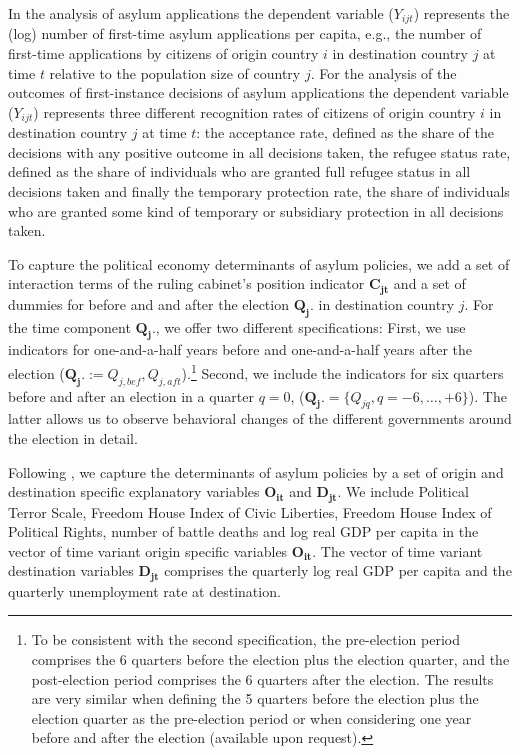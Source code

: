 \documentclass[a4paper,12pt]{article}
\begin{document}
In the analysis of asylum applications the dependent variable ($Y_{ijt}$) represents the (log) number of first-time asylum applications per capita, e.g., the number of first-time applications by citizens of origin country $i$ in destination country $j$ at time $t$ relative to the population size of country $j$. For the analysis of the outcomes of first-instance decisions of asylum applications the dependent variable ($Y_{ijt}$) represents three different recognition rates of citizens of origin country $i$ in destination country $j$ at time $t$: the acceptance rate, defined as the share of the decisions with any positive outcome in all decisions taken, the refugee status rate, defined as the share of individuals who are granted full refugee status in all decisions taken and finally the temporary protection rate, the share of individuals who are granted some kind of temporary or subsidiary protection in all decisions taken. 

To capture the political economy determinants of asylum policies, we add a set of interaction terms of the ruling cabinet's position indicator $\mathbf{C_{jt}}$ and  a set of dummies for before and and after the election $\mathbf{Q_j.}$ in destination country $j$. For the time component $\mathbf{Q_j.}$, we offer two different specifications: First, we use indicators for one-and-a-half years before and one-and-a-half years after the election ($\mathbf{Q_j.} := Q_{j,bef},  Q_{j,aft}$).\footnote{To be consistent with the second specification, the pre-election period comprises the 6 quarters before the election plus the election quarter, and the post-election period comprises the 6 quarters after the election. The results are very similar when defining the 5 quarters before the election plus the election quarter as the pre-election period or when considering one year before and after the election (available upon request).} Second, we include the indicators for six quarters before and after an election in a quarter $q=0$, ($\mathbf{Q_j.} =\{Q_{jq}, q = -6, \ldots, +6\}$). The latter allows us to observe behavioral changes of the different governments around the election in detail.

Following \cite{hatton2016}, we capture the determinants of asylum policies by a set of origin and destination specific explanatory variables $\mathbf{O_{it}}$ and $\mathbf{D_{jt}}$. We include Political Terror Scale, Freedom House Index of Civic Liberties, Freedom House Index of  Political Rights, number of battle deaths and log real GDP per capita in the vector of time variant origin specific variables $\mathbf{O_{it}}$. The vector of time variant destination variables $\mathbf{D_{jt}}$ comprises the quarterly log real GDP per capita and the quarterly unemployment rate at destination. 
 
\end{document}
